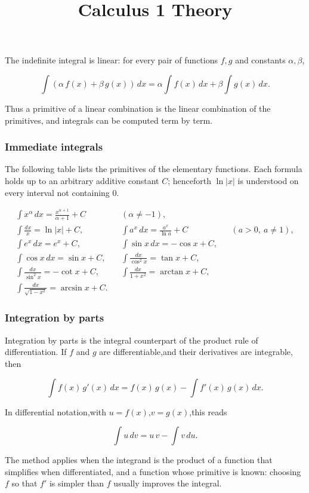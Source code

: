 \documentclass[11pt,a4paper]{article} \usepackage[T1]{fontenc}
\theoremstyle{plain} \newtheorem{theorem}{Theorem} \title{Calculus 1 Theory}
\begin{document}
The indefinite integral is linear: for every pair of functions $f,g$ and
constants $\alpha,\beta$,

\[
\int (\alpha\,f(x)+\beta\,g(x))\,dx
= \alpha\int f(x)\,dx + \beta\int g(x)\,dx.
\]

Thus a primitive of a linear combination is the linear combination of the
primitives, and integrals can be computed term by term.

\subsubsection {Immediate integrals}

The following table lists the primitives of the elementary functions. Each
formula holds up to an arbitrary additive constant $C$; henceforth $\ln|x|$ is
understood on every interval not containing $0$.

\begin{align*}
\int x^\alpha\,dx = \frac{x^{\alpha+1}}{\alpha+1}+C
&& (\alpha\neq -1), \\ \int \frac{dx}{x} = \ln|x|+C,
&& \int a^x\,dx = \frac{a^x}{\ln a}+C && (a>0,\ a\neq1),\\ \int e^x\,dx = e^x+C,
&& \int \sin x\,dx = -\cos x+C,\\ \int \cos x\,dx = \sin x+C,
&& \int \frac{dx}{\cos^2 x} = \tan x+C,\\ \int \frac{dx}{\sin^2 x} = -\cot x+C,
&& \int \frac{dx}{1+x^2} = \arctan x+C,\\ \int \frac{dx}{\sqrt{1-x^2}} = \arcsin x+C.
\end{align*}

\subsubsection {Integration by parts}

Integration by parts is the integral counterpart of the product rule of
differentiation. If $f$ and $g$ are differentiable,and their derivatives are
integrable, then

\[
\int f(x)\,g'(x)\,dx = f(x)\,g(x) - \int f'(x)\,g(x)\,dx.
\]

In differential notation,with $u=f(x)$,$v=g(x)$,this reads

\[
\int u\,dv = u\,v - \int v\,du.
\]

The method applies when the integrand is the product of a function that
simplifies when differentiated, and a function whose primitive is known:
choosing $f$ so that $f'$ is simpler than $f$ usually improves the integral.
\end{document}
